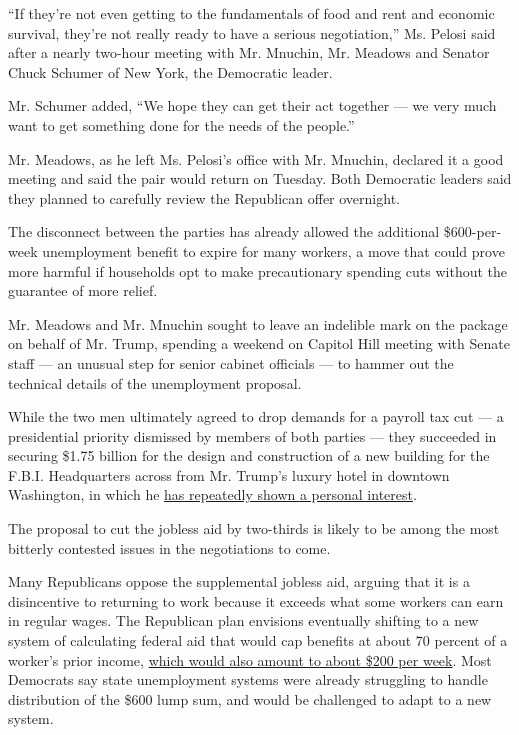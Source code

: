 ``If they're not even getting to the fundamentals of food and rent and
economic survival, they're not really ready to have a serious
negotiation,'' Ms. Pelosi said after a nearly two-hour meeting with Mr.
Mnuchin, Mr. Meadows and Senator Chuck Schumer of New York, the
Democratic leader.

Mr. Schumer added, ``We hope they can get their act together --- we very
much want to get something done for the needs of the people.''

Mr. Meadows, as he left Ms. Pelosi's office with Mr. Mnuchin, declared
it a good meeting and said the pair would return on Tuesday. Both
Democratic leaders said they planned to carefully review the Republican
offer overnight.

The disconnect between the parties has already allowed the additional
\$600-per-week unemployment benefit to expire for many workers, a move
that could prove more harmful if households opt to make precautionary
spending cuts without the guarantee of more relief.

Mr. Meadows and Mr. Mnuchin sought to leave an indelible mark on the
package on behalf of Mr. Trump, spending a weekend on Capitol Hill
meeting with Senate staff --- an unusual step for senior cabinet
officials --- to hammer out the technical details of the unemployment
proposal.

While the two men ultimately agreed to drop demands for a payroll tax
cut --- a presidential priority dismissed by members of both parties ---
they succeeded in securing \$1.75 billion for the design and
construction of a new building for the F.B.I. Headquarters across from
Mr. Trump's luxury hotel in downtown Washington, in which he
\href{https://www.nytimes3xbfgragh.onion/2018/10/18/us/politics/fbi-headquarters-building-trump.html}{has
repeatedly shown a personal interest}.

The proposal to cut the jobless aid by two-thirds is likely to be among
the most bitterly contested issues in the negotiations to come.

Many Republicans oppose the supplemental jobless aid, arguing that it is
a disincentive to returning to work because it exceeds what some workers
can earn in regular wages. The Republican plan envisions eventually
shifting to a new system of calculating federal aid that would cap
benefits at about 70 percent of a worker's prior income,
\href{https://www.nytimes3xbfgragh.onion/2020/07/23/business/economy/unemployment-benefits.html}{which
would also amount to about \$200 per week}. Most Democrats say state
unemployment systems were already struggling to handle distribution of
the \$600 lump sum, and would be challenged to adapt to a new system.

